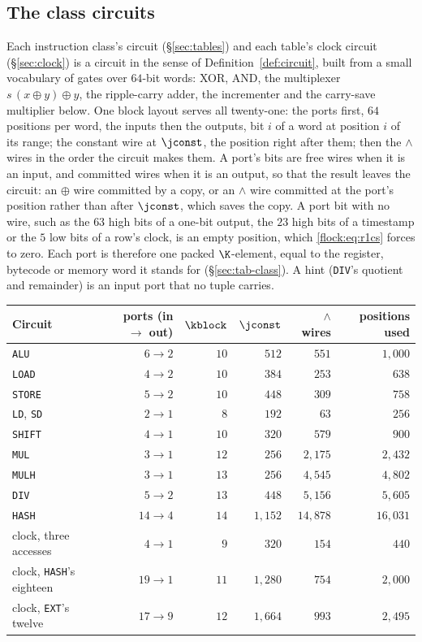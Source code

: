 \subsection{The class circuits}\label{flock:classes}

Each instruction class's circuit (\S\ref{sec:tables}) and each table's clock circuit (\S\ref{sec:clock}) is a circuit in the sense of Definition~\ref{def:circuit}, built from a small vocabulary of gates over $64$-bit words: XOR, AND, the multiplexer $s\,(x\oplus y)\oplus y$, the ripple-carry adder, the incrementer and the carry-save multiplier below. One block layout serves all twenty-one: the ports first, $64$ positions per word, the inputs then the outputs, bit $i$ of a word at position $i$ of its range; the constant wire at $\jconst$, the position right after them; then the $\wedge$ wires in the order the circuit makes them. A port's bits are free wires when it is an input, and committed wires when it is an output, so that the result leaves the circuit: an $\oplus$ wire committed by a copy, or an $\wedge$ wire committed at the port's position rather than after $\jconst$, which saves the copy. A port bit with no wire, such as the $63$ high bits of a one-bit output, the $23$ high bits of a timestamp or the $5$ low bits of a row's clock, is an empty position, which \eqref{flock:eq:r1cs} forces to zero. Each port is therefore one packed $\K$-element, equal to the register, bytecode or memory word it stands for (\S\ref{sec:tab-class}). A hint (\texttt{DIV}'s quotient and remainder) is an input port that no tuple carries.
\begin{center}
\begin{tabular}{lrrrrr}
\hline
Circuit & ports (in $\to$ out) & $\kblock$ & $\jconst$ & $\wedge$ wires & positions used\\
\hline
\texttt{ALU}   & $6\to2$  & $10$ & $512$   & $551$      & $1{,}000$\\
\texttt{LOAD}  & $4\to2$  & $10$ & $384$   & $253$      & $638$\\
\texttt{STORE} & $5\to2$  & $10$ & $448$   & $309$      & $758$\\
\texttt{LD}, \texttt{SD} & $2\to1$ & $8$ & $192$ & $63$ & $256$\\
\texttt{SHIFT} & $4\to1$  & $10$ & $320$   & $579$      & $900$\\
\texttt{MUL}   & $3\to1$  & $12$ & $256$   & $2{,}175$  & $2{,}432$\\
\texttt{MULH}  & $3\to1$  & $13$ & $256$   & $4{,}545$  & $4{,}802$\\
\texttt{DIV}   & $5\to2$  & $13$ & $448$   & $5{,}156$  & $5{,}605$\\
\texttt{HASH}  & $14\to4$ & $14$ & $1{,}152$ & $14{,}878$ & $16{,}031$\\
\hline
clock, three accesses & $4\to1$ & $9$ & $320$ & $154$ & $440$\\
clock, \texttt{HASH}'s eighteen & $19\to1$ & $11$ & $1{,}280$ & $754$ & $2{,}000$\\
clock, \texttt{EXT}'s twelve & $17\to9$ & $12$ & $1{,}664$ & $993$ & $2{,}495$\\
\hline
\end{tabular}
\end{center}
